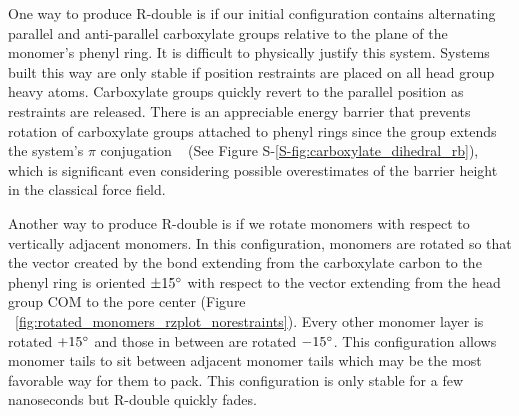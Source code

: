 \documentclass[journal=jpcbfk,manuscript=article]{achemso}
\begin{document}
  One way to produce R-double is if our initial configuration contains
  alternating parallel and anti-parallel carboxylate groups relative to the plane
  of the monomer's phenyl ring.  It is difficult to physically justify this
  system. Systems built this way are only stable if position restraints are
  placed on all head group heavy atoms.  Carboxylate groups quickly revert to the
  parallel position as restraints are released. There is an appreciable energy
  barrier that prevents rotation of carboxylate groups attached to phenyl rings
  since the group extends the system's $\pi$ conjugation ~\cite{carey_organic_2011} (See Figure
  S-\ref{S-fig:carboxylate_dihedral_rb}), which is significant even considering
  possible overestimates of the barrier height in the classical force field. 
%  

  Another way to produce R-double is if we rotate monomers with respect to
  vertically adjacent monomers. In this configuration, monomers are rotated so
  that the vector created by the bond extending from the carboxylate carbon to
  the phenyl ring is oriented $\pm 15 \degree$ with respect to the vector
  extending from the head group COM to the pore center (Figure
  ~\ref{fig:rotated_monomers_rzplot_norestraints}). Every other monomer layer is
  rotated $+15 \degree$ and those in between are rotated $-15 \degree$. This
  configuration allows monomer tails to sit between adjacent monomer tails which
  may be the most favorable way for them to pack. This configuration is only
  stable for a few nanoseconds but R-double quickly fades. 
  
\end{document}
